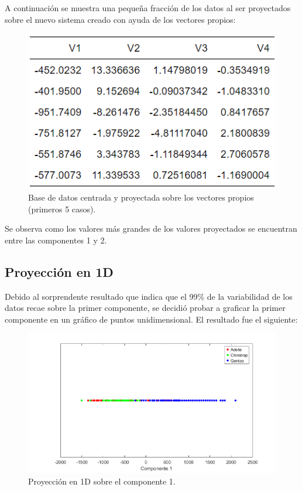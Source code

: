 \documentclass[11pt, letterpaper]{article}
\begin{document}
A continuación se muestra una pequeña fracción de los datos al ser proyectados sobre el nuevo sistema creado con ayuda de los vectores propios:

\begin{figure}[h!]
	\centering
	\begin{minipage}{0.8\textwidth}
		\centering
		\includegraphics[width=\textwidth]{IMG/T2.png}
		\caption{Base de datos centrada y proyectada sobre los vectores propios (primeros 5 casos).}
		\label{fig:f4}
	\end{minipage}\hfill
\end{figure}

Se observa como los valores más grandes de los valores proyectados se encuentran entre las componentes 1 y 2.

\newpage

\subsection{Proyección en 1D}

Debido al sorprendente resultado que indica que el 99\% de la variabilidad de los datos recae sobre la primer componente, se decidió probar a graficar la primer componente en un gráfico de puntos unidimensional. El resultado fue el siguiente:

\begin{figure}[h!]
	\centering
	\begin{minipage}{1.1\textwidth}
		\centering
		\includegraphics[width=\textwidth]{IMG/G3.png}
		\caption{Proyección en 1D sobre el componente 1.}
		\label{fig:f5}
	\end{minipage}\hfill
\end{figure}
\end{document}
